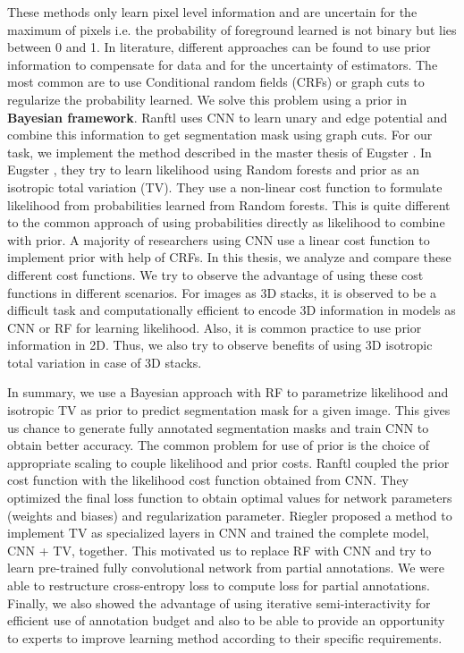 These methods only learn pixel level information and are uncertain for the maximum of pixels i.e. the probability of foreground learned is not binary but lies between 0 and 1. In literature, different approaches can be found to use prior information to compensate for data and for the uncertainty of estimators. The most common are to use Conditional random fields (CRFs) or graph cuts to regularize the probability learned. We solve this problem using a prior in \textbf{Bayesian framework}.  Ranftl \cite{ranftl:2014} uses CNN to learn unary and edge potential and combine this information to get segmentation mask using graph cuts. For our task, we implement the method described in the master thesis of Eugster \cite{dominic}. In Eugster \cite{dominic}, they try to learn likelihood using Random forests and prior as an isotropic total variation (TV). They use a non-linear cost function to formulate likelihood from probabilities learned from Random forests. This is quite different to the common approach of using probabilities directly as likelihood to combine with prior. A majority of researchers using CNN use a linear cost function to implement prior with help of CRFs. In this thesis, we analyze and compare these different cost functions. We try to observe the advantage of using these cost functions in different scenarios. For images as 3D stacks, it is observed to be a difficult task and computationally efficient to encode 3D information in models as CNN or RF for learning likelihood. Also, it is common practice to use prior information in 2D. Thus, we also try to observe benefits of using 3D isotropic total variation in case of 3D stacks. \par

In summary, we use a Bayesian approach with RF to parametrize likelihood and isotropic TV as prior to predict segmentation mask for a given image. This gives us chance to generate fully annotated segmentation masks and train CNN to obtain better accuracy. The common problem for use of prior is the choice of appropriate scaling to couple likelihood and prior costs. Ranftl \cite{ranftl:2014} coupled the prior cost function with the likelihood cost function obtained from CNN. They optimized the final loss function to obtain optimal values for network parameters (weights and biases) and regularization parameter. Riegler \cite{riegler:2016} \cite{riegler1:2016} proposed a method to implement TV as specialized layers in CNN and trained the complete model, CNN + TV, together. This motivated us to replace RF with CNN and try to learn pre-trained fully convolutional network from partial annotations. We were able to restructure cross-entropy loss to compute loss for partial annotations. \newline
Finally, we also showed the advantage of using iterative semi-interactivity for efficient use of annotation budget and also to be able to provide an opportunity to experts to improve learning method according to their specific requirements.

